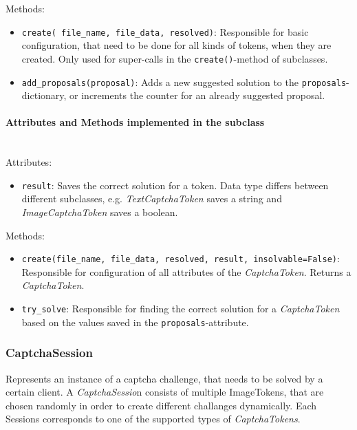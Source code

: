 Methods:

\begin{itemize}
\item \verb|create( file_name, file_data, resolved)|: Responsible for basic configuration, that need to be done for all kinds of tokens, when they are created. Only used for super-calls in the \verb|create()|-method of subclasses.
\item \verb|add_proposals(proposal)|: Adds a new suggested solution to the \verb|proposals|-dictionary, or increments the counter for an already suggested proposal.
\end{itemize}

\paragraph{Attributes and Methods implemented in the subclass} \mbox{} \\



Attributes: 


\begin{itemize}
\item \verb|result|: Saves the correct solution for a token. Data type differs between different subclasses, e.g. \emph{TextCaptchaToken} saves a string and \emph{ImageCaptchaToken} saves a boolean.
\end{itemize}


Methods:


\begin{itemize}
\item \verb|create(file_name, file_data, resolved, result, insolvable=False)|: Responsible for configuration of all attributes of the \emph{CaptchaToken}. Returns a \emph{CaptchaToken}.
\item \verb|try_solve|: Responsible for finding the correct solution for a \emph{CaptchaToken} based on the values saved in the \verb|proposals|-attribute.
\end{itemize}


\subsubsection{CaptchaSession}

Represents an instance of a captcha challenge, that needs to be solved by a certain client. A \emph{CaptchaSessio}n consists of multiple ImageTokens, that are chosen randomly in order to create different challanges dynamically. Each Sessions corresponds to one of the supported types of \emph{CaptchaTokens}.


